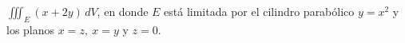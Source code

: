 \item $\iiint_E (x + 2y) \, dV$, en donde $E$ está limitada por el cilindro parabólico $y = x^2$ y los planos $x = z, \ x = y$ y $z = 0$.
